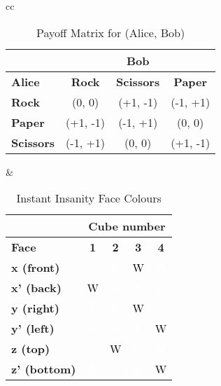 \documentclass[preview, border=2mm]{standalone}
\newcommand{\R}{\cellcolor{red}\textcolor{white}{R}}
\newcommand{\B}{\cellcolor{blue}\textcolor{white}{B}}
\newcommand{\G}{\cellcolor{green}\textcolor{white}{G}}
\newcommand{\W}{\cellcolor{white}\textcolor{black}{W}}
\begin{document}
{\sffamily\everymath{\sf}

\vspace*{\fill}

\centering

\begin{tabular}{cc}

\begin{minipage}{0.45\textwidth}
\begin{table}
\centering
\begin{tabular}{l|c|c|c}
\multicolumn{1}{c|}{} & \multicolumn{3}{c}{\textbf{Bob}} \\
\hline
\textbf{Alice} & \textbf{Rock} & \textbf{Scissors} & \textbf{Paper} \\
\hline
\textbf{Rock}     & (0, 0)     & (+1, -1)   & (-1, +1)   \\
\textbf{Paper}    & (+1, -1)   & (-1, +1)   & (0, 0)     \\
\textbf{Scissors} & (-1, +1)   & (0, 0)     & (+1, -1)   \\
\end{tabular}
\caption*{{\sffamily Payoff Matrix for (Alice, Bob)}}
\end{table}
\end{minipage}

&

\begin{minipage}{0.45\textwidth}
\begin{table}
\centering
\begin{tabular}{l|c|c|c|c}
\multicolumn{1}{c|}{} & \multicolumn{4}{c}{\textbf{Cube number}} \\
\hline
\textbf{Face} & \textbf{1} & \textbf{2} & \textbf{3} & \textbf{4} \\
\hline
\textbf{x (front)}     & \G & \R & \W & \B \\
\textbf{x' (back)}     & \W & \G & \R & \R \\
\hline
\textbf{y (right)}     & \B & \B & \W & \G \\
\textbf{y' (left)}     & \R & \B & \B & \W \\
\hline
\textbf{z (top)}       & \R & \W & \G & \B \\
\textbf{z' (bottom)}   & \R & \G & \R & \W \\
\end{tabular}
\caption*{{\sffamily Instant Insanity Face Colours}}
\end{table}
\end{minipage}

\end{tabular}

\vspace*{\fill}

}
\end{document}
